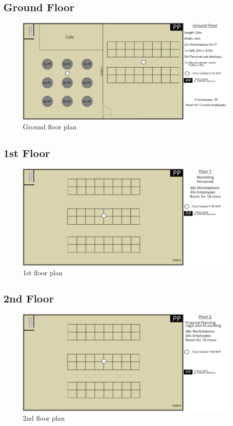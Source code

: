 \subsection{Ground Floor}
\begin{figure}[H]
    \includegraphics[width=15cm]{Figures/ground.png}
    \caption{Ground floor plan}
    \label{fig:ground_floor}
\end{figure}
\subsection{1st Floor}
\begin{figure}[H]
    \includegraphics[width=15cm]{Figures/1st-floor.png}
    \caption{1st floor plan}
    \label{fig:1st_floor}
\end{figure}
\subsection{2nd Floor}
\begin{figure}[H]
    \includegraphics[width=15cm]{Figures/2nd-floor.png}
    \caption{2nd floor plan}
    \label{fig:2nd_floor}
\end{figure}
